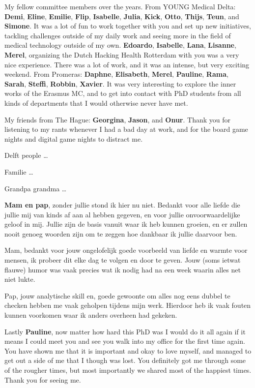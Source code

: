 My fellow committee members over the years.
From YOUNG Medical Delta: \textbf{Demi}, \textbf{Eline}, \textbf{Emilie}, \textbf{Flip}, \textbf{Isabelle}, \textbf{Julia}, \textbf{Kick}, \textbf{Otto}, \textbf{Thijs}, \textbf{Teun}, and \textbf{Simone}.
It was a lot of fun to work together with you and set up new initiatives, tackling challenges outside of my daily work and seeing more in the field of medical technology outside of my own.
\textbf{Edoardo}, \textbf{Isabelle}, \textbf{Lana}, \textbf{Lisanne}, \textbf{Merel}, organizing the Dutch Hacking Health Rotterdam with you was a very nice experience.
There was a lot of work, and it was an intense, but very exciting weekend.
From Promeras: \textbf{Daphne}, \textbf{Elisabeth}, \textbf{Merel}, \textbf{Pauline}, \textbf{Rama}, \textbf{Sarah}, \textbf{Steffi}, \textbf{Robbin}, \textbf{Xavier}.
It was very interesting to explore the inner works of the Erasmus MC, and to get into contact with PhD students from all kinds of departments that I would otherwise never have met.


My friends from The Hague: \textbf{Georgina}, \textbf{Jason}, and \textbf{Onur}.
Thank you for listening to my rants whenever I had a bad day at work, and for the board game nights and digital game nights to distract me.

Delft people \dots

Familie \dots

Grandpa grandma \dots

\textbf{Mam en pap}, zonder jullie stond ik hier nu niet.
Bedankt voor alle liefde die jullie mij van kinds af aan al hebben gegeven, en voor jullie onvoorwaardelijke geloof in mij.
Jullie zijn de basis vanuit waar ik heb kunnen groeien, en er zullen nooit genoeg woorden zijn om te zeggen hoe dankbaar ik jullie daarvoor ben.

Mam, bedankt voor jouw ongelofelijk goede voorbeeld van liefde en warmte voor mensen, ik probeer dit elke dag te volgen en door te geven.
Jouw (soms ietwat flauwe) humor was vaak precies wat ik nodig had na een week waarin alles net niet lukte.

Pap, jouw analytische skill en, goede gewoonte om alles nog eens dubbel te checken hebben me vaak geholpen tijdens mijn werk.
Hierdoor heb ik vaak fouten kunnen voorkomen waar ik anders overheen had gekeken.

Lastly \textbf{Pauline}, now matter how hard this PhD was I would do it all again if it means I could meet you and see you walk into my office for the first time again.
You have shown me that it is important and okay to love myself, and managed to get out a side of me that I though was lost.
You definitely got me through some of the rougher times, but most importantly we shared most of the happiest times.
Thank you for seeing me.
